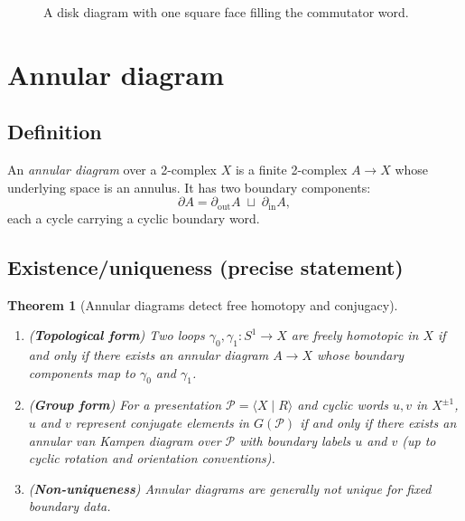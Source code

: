 \documentclass[11pt]{article}
\newtheorem{theorem}{Theorem}[section]
\theoremstyle{definition}
\theoremstyle{plain}
\theoremstyle{remark}
\begin{document}
\begin{figure}[h]
\centering
{}
\caption{A disk diagram with one square face filling the commutator word.}
\end{figure}


\clearpage
\section{Annular diagram}

\subsection*{Definition}
An \emph{annular diagram} over a 2-complex $X$ is a finite 2-complex $A\to X$ whose underlying space is an annulus.
It has two boundary components:
\[
\partial A=\partial_{\mathrm{out}}A\;\sqcup\;\partial_{\mathrm{in}}A,
\]
each a cycle carrying a cyclic boundary word.

\subsection*{Existence/uniqueness (precise statement)}
\begin{theorem}[Annular diagrams detect free homotopy and conjugacy]\label{thm:annulus}
\begin{enumerate}[leftmargin=2.2em]
\item (\textbf{Topological form}) Two loops $\gamma_0,\gamma_1:S^1\to X$ are freely homotopic in $X$
if and only if there exists an annular diagram $A\to X$ whose boundary components map to $\gamma_0$ and $\gamma_1$.
\item (\textbf{Group form}) For a presentation $\mathcal P=\langle X\mid R\rangle$ and cyclic words $u,v$ in $X^{\pm1}$,
$u$ and $v$ represent conjugate elements in $G(\mathcal P)$ if and only if there exists an annular van Kampen diagram over $\mathcal P$
with boundary labels $u$ and $v$ (up to cyclic rotation and orientation conventions).
\item (\textbf{Non-uniqueness}) Annular diagrams are generally not unique for fixed boundary data.
\end{enumerate}
\end{theorem}
\end{document}
